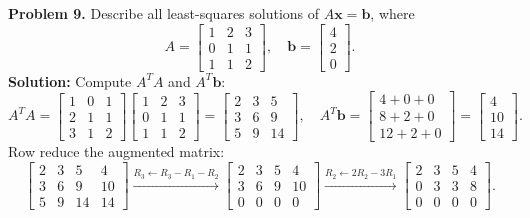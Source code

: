 \documentclass[11pt, letterpaper]{article}
\theoremstyle{definition}
\theoremstyle{remark}
\begin{document}
\textbf{Problem 9.} Describe all least-squares solutions of $A\mathbf{x} = \mathbf{b}$, where
\[
A = \begin{bmatrix} 1 & 2 & 3 \\ 0 & 1 & 1 \\ 1 & 1 & 2 \end{bmatrix}, \quad \mathbf{b} = \begin{bmatrix} 4 \\ 2 \\ 0 \end{bmatrix}.
\]
\textbf{Solution:} Compute $A^T A$ and $A^T \mathbf{b}$:
\[
A^T A = \begin{bmatrix} 1 & 0 & 1 \\ 2 & 1 & 1 \\ 3 & 1 & 2 \end{bmatrix} \begin{bmatrix} 1 & 2 & 3 \\ 0 & 1 & 1 \\ 1 & 1 & 2 \end{bmatrix} = \begin{bmatrix} 2 & 3 & 5 \\ 3 & 6 & 9 \\ 5 & 9 & 14 \end{bmatrix}, \quad A^T \mathbf{b} = \begin{bmatrix} 4+0+0 \\ 8+2+0 \\ 12+2+0 \end{bmatrix} = \begin{bmatrix} 4 \\ 10 \\ 14 \end{bmatrix}.
\]
Row reduce the augmented matrix:
\[
\left[\begin{array}{ccc|c} 2 & 3 & 5 & 4 \\ 3 & 6 & 9 & 10 \\ 5 & 9 & 14 & 14 \end{array}\right] \xrightarrow{R_3 \leftarrow R_3 - R_1 - R_2} \left[\begin{array}{ccc|c} 2 & 3 & 5 & 4 \\ 3 & 6 & 9 & 10 \\ 0 & 0 & 0 & 0 \end{array}\right] \xrightarrow{R_2 \leftarrow 2R_2 - 3R_1} \left[\begin{array}{ccc|c} 2 & 3 & 5 & 4 \\ 0 & 3 & 3 & 8 \\ 0 & 0 & 0 & 0 \end{array}\right].
\]
\end{document}
